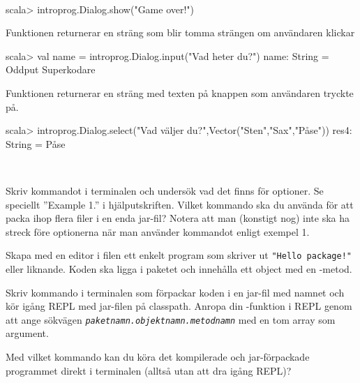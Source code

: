 \SOLUTION

\TaskSolved \what~

\SubtaskSolved
\begin{REPL}
scala> introprog.Dialog.show("Game over!")
\end{REPL}

\SubtaskSolved Funktionen  returnerar en sträng som blir tomma strängen  om användaren klickar 
\begin{REPL}
scala> val name = introprog.Dialog.input("Vad heter du?")
name: String = Oddput Superkodare
\end{REPL}

\SubtaskSolved Funktionen  returnerar en sträng med texten på knappen som användaren tryckte på.
\begin{REPL}
scala> introprog.Dialog.select("Vad väljer du?",Vector("Sten","Sax","Påse"))
res4: String = Påse
\end{REPL}

\QUESTEND





\QUESTBEGIN

\Task\Uberkurs  \what~

\Subtask Skriv kommandot  i terminalen och undersök vad det finns för optioner. Se speciellt ''Example 1.'' i hjälputskriften. Vilket kommando ska du använda för att packa ihop flera filer i en enda jar-fil? Notera att man (konstigt nog) inte ska ha streck före optionerna när man använder kommandot  enligt exempel 1.

\Subtask Skapa med en editor i filen  ett enkelt program som skriver ut \texttt{"Hello package!"} eller liknande. Koden ska ligga i paketet  och innehålla ett object  med en -metod.

\Subtask Skriv kommando i terminalen som förpackar koden i en jar-fil med namnet  och kör igång REPL med jar-filen på classpath. Anropa din -funktion i REPL genom att ange sökvägen \textit{\texttt{paketnamn.objektnamn.metodnamn}} med en tom array som argument.

\Subtask Med vilket kommando kan du köra det kompilerade och jar-förpackade programmet direkt i terminalen (alltså utan att dra igång REPL)?

\SOLUTION

\TaskSolved \what

\SubtaskSolved

